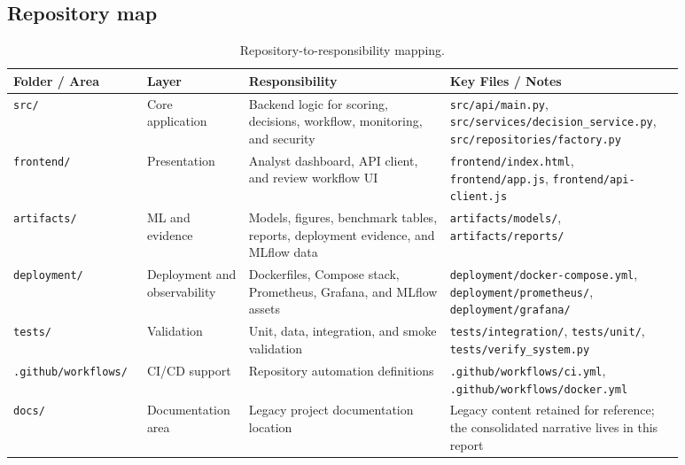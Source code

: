 \documentclass[11pt]{article}
\newcommand{\code}[1]{\texttt{#1}}
\begin{document}
\subsection{Repository map}
\begin{table}[H]
\centering
\begin{tabular}{p{0.15\linewidth}p{0.13\linewidth}p{0.28\linewidth}p{0.32\linewidth}}
\toprule
Folder / Area & Layer & Responsibility & Key Files / Notes \\
\midrule
\code{src/} & Core application & Backend logic for scoring, decisions, workflow, monitoring, and security & \code{src/api/main.py}, \code{src/services/decision_service.py}, \code{src/repositories/factory.py} \\
\code{frontend/} & Presentation & Analyst dashboard, API client, and review workflow UI & \code{frontend/index.html}, \code{frontend/app.js}, \code{frontend/api-client.js} \\
\code{artifacts/} & ML and evidence & Models, figures, benchmark tables, reports, deployment evidence, and MLflow data & \code{artifacts/models/}, \code{artifacts/reports/} \\
\code{deployment/} & Deployment and observability & Dockerfiles, Compose stack, Prometheus, Grafana, and MLflow assets & \code{deployment/docker-compose.yml}, \code{deployment/prometheus/}, \code{deployment/grafana/} \\
\code{tests/} & Validation & Unit, data, integration, and smoke validation & \code{tests/integration/}, \code{tests/unit/}, \code{tests/verify_system.py} \\
\code{.github/workflows/} & CI/CD support & Repository automation definitions & \code{.github/workflows/ci.yml}, \code{.github/workflows/docker.yml} \\
\code{docs/} & Documentation area & Legacy project documentation location & Legacy content retained for reference; the consolidated narrative lives in this report \\
\bottomrule
\end{tabular}
\caption{Repository-to-responsibility mapping.}
\end{table}
\end{document}
